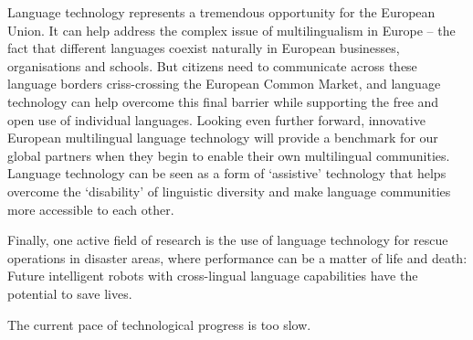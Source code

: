 \documentclass[]{../../metanetpaper}
\begin{document}
\begin{Parallel}[c]{77mm}{77mm}
{Language technology represents a tremendous opportunity for the European Union.
It can help address the complex issue of multilingualism in Europe – the fact
that different languages coexist naturally in European businesses,
organisations and schools. But citizens need to communicate across these
language borders criss-crossing the European Common Market, and language
technology can help overcome this final barrier while supporting the free and
open use of individual languages. Looking even further forward, innovative
European multilingual language technology will provide a benchmark for our
global partners when they begin to enable their own multilingual communities.
Language technology can be seen as a form of ‘assistive’ technology that helps
overcome the ‘disability’ of linguistic diversity and make language communities
more accessible to each other.

Finally, one active field of research is the use of language technology for
rescue operations in disaster areas, where performance can be a matter of life
and death: Future intelligent robots with cross-lingual language capabilities
have the potential to save lives.

The current pace of technological progress is too slow.
}

\ParallelPar




\end{Parallel}
\end{document}
